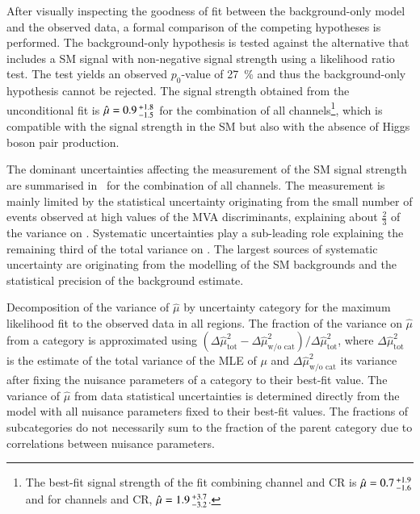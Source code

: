 
After visually inspecting the goodness of fit between the
background-only model and the observed data, a formal comparison of
the competing hypotheses is performed. The background-only hypothesis
is tested against the alternative that includes a SM \HH signal with
non-negative signal strength using a likelihood ratio test. The test
yields an observed $p_0$-value of \SI{27}{\percent} and thus the
background-only hypothesis cannot be rejected.
The signal strength obtained from the unconditional fit is
$\hat{\mu} = 0.9\,\numpmerr{+1.8}{-1.5}$ for the combination of all
channels\footnote{The best-fit signal strength of the fit combining
  \hadhad channel and CR is $\hat{\mu} = 0.7\,\numpmerr{+1.9}{-1.6}$
  and for \lephad channels and CR,
  $\hat{\mu} = 1.9\,\numpmerr{+3.7}{-3.2}$.}, which is compatible with
the signal strength in the SM but also with the absence of Higgs boson
pair production.

The dominant uncertainties affecting the measurement of the SM \HH
signal strength are summarised in~ for the
combination of all channels. The measurement is mainly limited by the
statistical uncertainty originating from the small number of events
observed at high values of the MVA discriminants, explaining about
$\frac{2}{3}$ of the variance on \muhat. Systematic uncertainties play
a sub-leading role explaining the remaining third of the total
variance on \muhat. The largest sources of systematic uncertainty are
originating from the modelling of the SM backgrounds and the
statistical precision of the background estimate.

\begin{table}[htbp]
  \centering

  \caption{Decomposition of the variance of $\hat{\mu}$ by uncertainty
    category for the maximum likelihood fit to the observed data in
    all regions. The fraction of the variance on $\hat{\mu}$ from a
    category is approximated using
    $(\Delta\hat{\mu}^2_{\text{tot}} - \Delta\hat{\mu}^2_{\text{w/o
        cat}}) / \Delta \hat{\mu}^2_{\text{tot}}$, where
    $\Delta\hat{\mu}^2_{\text{tot}}$ is the estimate of the total
    variance of the MLE of $\mu$ and
    $\Delta\hat{\mu}^2_{\text{w/o cat}}$ its variance after fixing the
    nuisance parameters of a category to their best-fit value. The
    variance of $\hat{\mu}$ from data statistical uncertainties is
    determined directly from the model with all nuisance parameters
    fixed to their best-fit values. The fractions of subcategories do
    not necessarily sum to the fraction of the parent category due to
    correlations between nuisance parameters.}

  

  \label{tab:breakdown_nonres}
\end{table}

